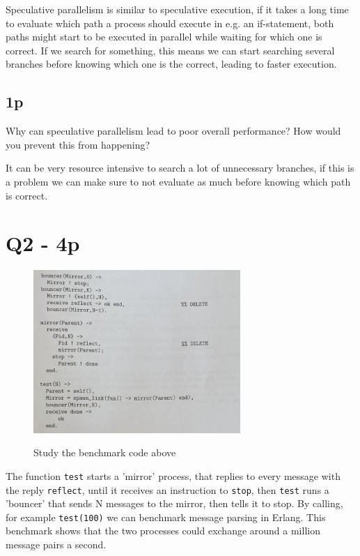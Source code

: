 Speculative parallelism is similar to speculative execution, if it takes a long time to evaluate which path a process should execute in e.g. an if-statement, both paths might start to be executed in parallel while waiting for which one is correct. If we search for something, this means we can start searching several branches before knowing which one is the correct, leading to faster execution.

\subsection{1p}
Why can speculative parallelism lead to poor overall performance? How would you prevent this from happening?

It can be very resource intensive to search a lot of unnecessary branches, if this is a problem we can make sure to not evaluate as much before knowing which path is correct.

\section{Q2 - 4p}
\begin{figure}[H]
	\centering
	\includegraphics[width=0.7\textwidth]{images/24_2.png}
	\label{fig:24_2}
	\caption{Study the benchmark code above}
\end{figure}
The function \lstinline{test} starts a 'mirror' process, that replies to every message with the reply \lstinline{reflect}, until it receives an instruction to \lstinline{stop}, then \lstinline{test} runs a 'bouncer' that sends N messages to the mirror, then tells it to stop. By calling, for example \lstinline{test(100)} we can benchmark message parsing in Erlang.
This benchmark shows that the two processes could exchange around a million message pairs a second.
